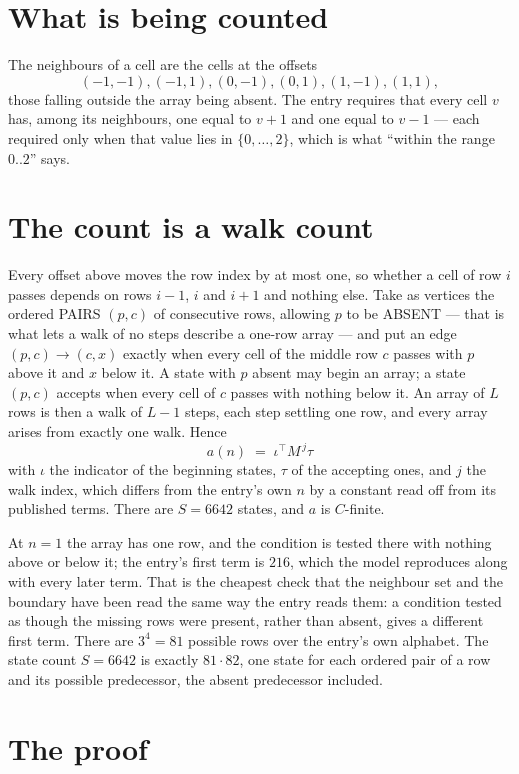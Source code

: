 \documentclass[11pt,a4paper]{article}
\theoremstyle{plain}
\theoremstyle{definition}
\begin{document}
\section{What is being counted}

The neighbours of a cell are the cells at the offsets
\[
(-1,-1), (-1,1), (0,-1), (0,1), (1,-1), (1,1),
\]
those falling outside the array being absent. The entry requires that every cell $v$ has, among its neighbours, one equal to $v+1$ and one equal to $v-1$ --- each required only when that value lies in $\{0,\dots,2\}$, which is what ``within the range $0..2$'' says.

\section{The count is a walk count}

Every offset above moves the row index by at most one, so whether a cell of row $i$ passes
depends on rows $i-1$, $i$ and $i+1$ and nothing else. Take as vertices the ordered PAIRS
$(p,c)$ of consecutive rows, allowing $p$ to be ABSENT --- that is what lets a walk of no steps
describe a one-row array --- and put an edge $(p,c)\to(c,x)$ exactly when every cell of the
middle row $c$ passes with $p$ above it and $x$ below it. A state with $p$ absent may begin an
array; a state $(p,c)$ accepts when every cell of $c$ passes with nothing below it. An array of
$L$ rows is then a walk of $L-1$ steps, each step settling one row, and every array arises from
exactly one walk. Hence
\[
a(n)\;=\;\iota^{\!\top}M^{\,j}\tau
\]
with $\iota$ the indicator of the beginning states, $\tau$ of the accepting ones, and $j$ the
walk index, which differs from the entry's own $n$ by a constant read off from its published
terms. There are $S=6642$ states, and $a$ is $C$-finite.

At $n=1$ the array has one row, and
the condition is tested there with nothing above or below it; the entry's first term is
$216$, which the model reproduces along with every later term. That is the cheapest check
that the neighbour set and the boundary have been read the same way the entry reads them: a
condition tested as though the missing rows were present, rather than absent, gives a different
first term. There are $3^{4}=81$ possible rows over the entry's own alphabet. The state count $S=6642$ is exactly $81\cdot82$,
one state for each ordered pair of a row and its possible predecessor, the absent predecessor
included.

\section{The proof}
\end{document}
